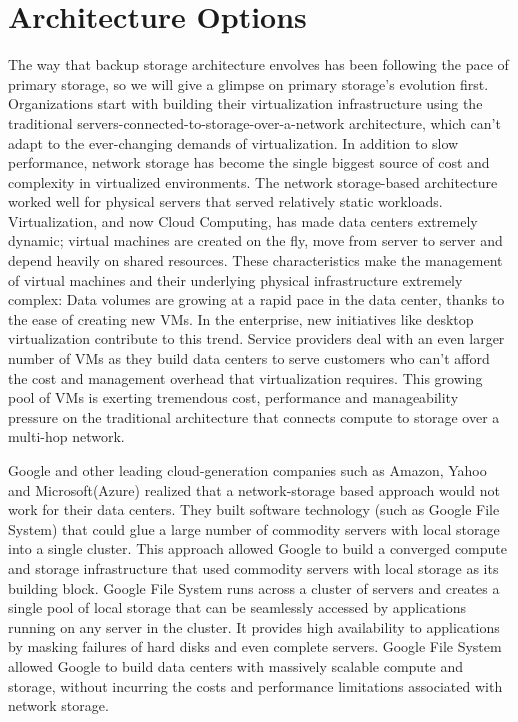 \section{Architecture Options} 
\label{back:arch}
The way that backup storage architecture envolves has been following the pace of
primary storage, so we will give a glimpse on primary storage's evolution first.
Organizations start with ﻿building ﻿their ﻿virtualization ﻿infrastructure ﻿using ﻿the﻿
traditional ﻿servers-connected-to-storage-over-a-network ﻿architecture, ﻿which﻿
can’t ﻿adapt ﻿to ﻿the ﻿ever-changing ﻿demands ﻿of ﻿virtualization. ﻿In ﻿addition ﻿to ﻿slow﻿
performance,﻿ network ﻿storage ﻿has ﻿become﻿ the﻿ single﻿ biggest﻿ source ﻿of ﻿cost ﻿and﻿
complexity ﻿in ﻿virtualized ﻿environments.﻿ The ﻿network﻿ storage-based ﻿architecture﻿
worked﻿ well ﻿for ﻿physical﻿ servers ﻿that ﻿served﻿ relatively﻿ static ﻿workloads.﻿
Virtualization,﻿ and﻿ now﻿ Cloud﻿ Computing,﻿ has﻿ made﻿ data﻿ centers﻿ extremely﻿
dynamic\cite{berkeleycloud09};﻿ virtual﻿ machines﻿ are﻿ created﻿ on﻿ the﻿ fly,﻿ move﻿ from﻿ server﻿ to﻿ server﻿ and﻿﻿
depend﻿ heavily﻿ on﻿ shared﻿ resources.﻿ These ﻿characteristics ﻿make ﻿the ﻿management﻿
of ﻿virtual ﻿machines ﻿and ﻿their﻿ underlying ﻿physical﻿ infrastructure ﻿extremely﻿
complex: Data ﻿volumes ﻿are﻿ growing﻿ at ﻿a ﻿rapid ﻿pace﻿ in﻿ the ﻿data ﻿center, ﻿thanks﻿ to ﻿the ﻿ease﻿
of﻿ creating ﻿new﻿ VMs.﻿ In ﻿the﻿ enterprise,﻿ new﻿ initiatives ﻿like ﻿desktop﻿ virtualization﻿
contribute﻿ to ﻿this﻿ trend.﻿ Service﻿ providers﻿ deal﻿ with﻿ an﻿ even﻿ larger﻿ number﻿ of﻿
VMs﻿ as﻿ they﻿ build﻿ data﻿ centers﻿ to﻿ serve﻿ customers﻿ who﻿ can’t﻿ afford﻿ the﻿ cost﻿
and﻿ management﻿ overhead﻿ that﻿ virtualization ﻿requires. ﻿This﻿ growing ﻿pool ﻿of﻿
VMs﻿ is ﻿exerting ﻿tremendous ﻿cost, ﻿performance﻿ and ﻿manageability ﻿pressure﻿ on﻿
the ﻿traditional ﻿architecture ﻿that ﻿connects﻿ compute﻿ to ﻿storage﻿ over ﻿a ﻿multi-hop﻿
network.﻿

Google﻿\cite{googlefs03} and﻿ other﻿ leading ﻿cloud-generation﻿ companies ﻿such﻿ as ﻿Amazon,﻿ Yahoo﻿
and﻿ Microsoft﻿(Azure)﻿\cite{azure} realized ﻿that ﻿a ﻿network-storage﻿ based﻿ approach﻿ would﻿
not ﻿work﻿ for﻿ their﻿ data ﻿centers.﻿ They﻿ built﻿ software﻿ technology﻿ (such ﻿as ﻿Google﻿
File ﻿System)﻿ that﻿ could ﻿glue﻿ a﻿ large﻿ number﻿ of ﻿commodity﻿ servers﻿ with﻿ local﻿
storage ﻿into ﻿a ﻿single﻿ cluster.﻿ This﻿ approach﻿ allowed﻿ Google﻿ to ﻿build ﻿a ﻿converged﻿
compute﻿ and﻿ storage ﻿infrastructure﻿ that﻿ used﻿ commodity﻿ servers﻿ with﻿ local﻿
storage﻿ as ﻿its ﻿building ﻿block\cite{deconstructing05}.﻿ Google﻿ File﻿ System﻿ runs﻿ across﻿ a ﻿cluster ﻿of ﻿servers﻿
and﻿ creates ﻿a ﻿single ﻿pool﻿ of﻿ local﻿ storage﻿ that﻿ can ﻿be﻿ seamlessly﻿ accessed﻿ by﻿
applications﻿ running﻿ on ﻿any ﻿server﻿ in﻿ the ﻿cluster.﻿ It ﻿provides﻿ high﻿ availability﻿
to ﻿applications ﻿by ﻿masking﻿ failures ﻿of ﻿hard﻿ disks ﻿and ﻿even﻿ complete ﻿servers.﻿
Google﻿ File﻿ System ﻿allowed ﻿Google﻿ to﻿ build﻿ data﻿ centers ﻿with﻿ massively ﻿scalable﻿
compute﻿ and﻿ storage,﻿ without ﻿incurring ﻿the ﻿costs﻿ and﻿ performance﻿ limitations﻿
associated ﻿with﻿ network ﻿storage.﻿

